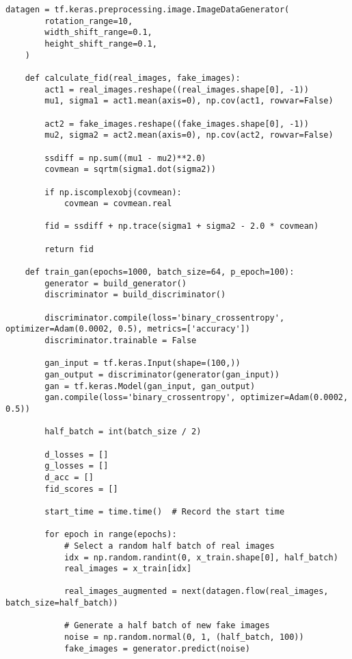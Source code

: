 \begin{lstlisting}[style=mypython, caption={Explore Data Augmentation (rotation {10}, width and \\ height shift {0.1})},captionpos=t]
    datagen = tf.keras.preprocessing.image.ImageDataGenerator(
        rotation_range=10,
        width_shift_range=0.1,
        height_shift_range=0.1,
    )
    
    def calculate_fid(real_images, fake_images):
        act1 = real_images.reshape((real_images.shape[0], -1))
        mu1, sigma1 = act1.mean(axis=0), np.cov(act1, rowvar=False)
        
        act2 = fake_images.reshape((fake_images.shape[0], -1))
        mu2, sigma2 = act2.mean(axis=0), np.cov(act2, rowvar=False)
        
        ssdiff = np.sum((mu1 - mu2)**2.0)
        covmean = sqrtm(sigma1.dot(sigma2))
        
        if np.iscomplexobj(covmean):
            covmean = covmean.real
        
        fid = ssdiff + np.trace(sigma1 + sigma2 - 2.0 * covmean)
        
        return fid
    
    def train_gan(epochs=1000, batch_size=64, p_epoch=100):
        generator = build_generator()
        discriminator = build_discriminator()
    
        discriminator.compile(loss='binary_crossentropy', optimizer=Adam(0.0002, 0.5), metrics=['accuracy'])
        discriminator.trainable = False
    
        gan_input = tf.keras.Input(shape=(100,))
        gan_output = discriminator(generator(gan_input))
        gan = tf.keras.Model(gan_input, gan_output)
        gan.compile(loss='binary_crossentropy', optimizer=Adam(0.0002, 0.5))
    
        half_batch = int(batch_size / 2)
        
        d_losses = []
        g_losses = []
        d_acc = []
        fid_scores = []
        
        start_time = time.time()  # Record the start time
    
        for epoch in range(epochs):
            # Select a random half batch of real images
            idx = np.random.randint(0, x_train.shape[0], half_batch)
            real_images = x_train[idx]
    
            real_images_augmented = next(datagen.flow(real_images, batch_size=half_batch))
    
            # Generate a half batch of new fake images
            noise = np.random.normal(0, 1, (half_batch, 100))
            fake_images = generator.predict(noise)
    

\end{lstlisting}
